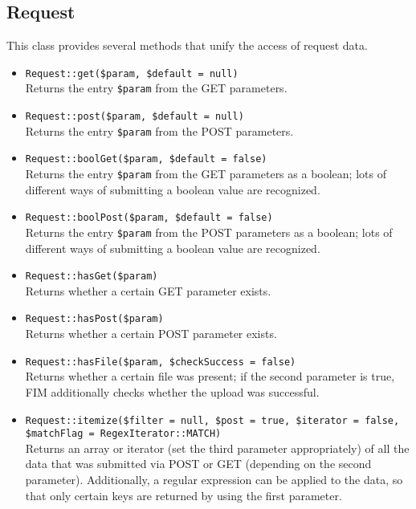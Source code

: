 \documentclass{scrartcl}
\begin{document}
   \subsection{Request}
      This class provides several methods that unify the access of request data.
      \begin{itemize}
         \item \lstinline!Request::get($param, $default = null)! \\
            Returns the entry \lstinline!$param! from the GET parameters.
         \item \lstinline!Request::post($param, $default = null)! \\
            Returns the entry \lstinline!$param! from the POST parameters.
         \item \lstinline!Request::boolGet($param, $default = false)! \\
            Returns the entry \lstinline!$param! from the GET parameters as a boolean; lots of different ways of submitting a boolean value are recognized.
         \item \lstinline!Request::boolPost($param, $default = false)! \\
            Returns the entry \lstinline!$param! from the POST parameters as a boolean; lots of different ways of submitting a boolean value are recognized.
         \item \lstinline!Request::hasGet($param)! \\
            Returns whether a certain GET parameter exists.
         \item \lstinline!Request::hasPost($param)! \\
            Returns whether a certain POST parameter exists.
         \item \lstinline!Request::hasFile($param, $checkSuccess = false)! \\
            Returns whether a certain file was present; if the second parameter is true, FIM additionally checks whether the upload was successful.
         \item \lstinline!Request::itemize($filter = null, $post = true, $iterator = false, $matchFlag = RegexIterator::MATCH)! \\
            Returns an array or iterator (set the third parameter appropriately) of all the data that was submitted via POST or GET (depending on the second parameter). Additionally, a regular expression can be applied to the data, so that only certain keys are returned by using the first parameter.

\end{itemize}
\end{document}

